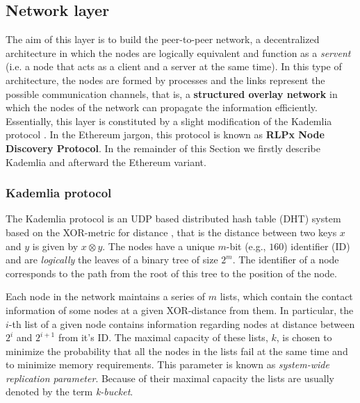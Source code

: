 \subsection{Network layer}
\label{sec:network-layer}

The aim of this layer is to build the peer-to-peer network, a decentralized
architecture in which the nodes are logically equivalent and function as a
\emph{servent} (i.e. a node that acts as a client and a server at the same
time). In this type of architecture, the nodes are formed by processes and the
links represent the possible communication channels, that is, a
\textbf{structured overlay network} \cite{van2017distributed} in which the nodes
of the network can propagate the information efficiently. Essentially, this
layer is constituted by a slight modification of the Kademlia protocol
\cite{bib:kademlia}. In the Ethereum jargon, this protocol is known as
\textbf{RLPx Node Discovery Protocol}.
In the remainder of this Section we firstly describe Kademlia and afterward
the Ethereum variant.


\subsubsection{Kademlia protocol}
The Kademlia protocol is an UDP based distributed hash table (DHT)
system based on the
XOR-metric for distance \cite{bib:kademlia}, that is the distance between two
keys $x$ and $y$ is given by $x \otimes y$.
The nodes have a unique $m$-bit (e.g., $160$) identifier (ID) and are
\emph{logically} the leaves of a binary tree of size $2^m$.
The identifier of a node corresponds
to the path from the root of this tree to the position of the node.

Each node in the network maintains a series of $m$
lists, which contain the contact information of some nodes at a given
XOR-distance from them.
In particular, the $i$-th list of a given node contains
information regarding nodes at distance between $2^i$ and $2^{i+1}$ from
it's ID.
The maximal capacity of these lists, $k$, is chosen to minimize the
probability that all the nodes in the lists fail at the same
time and to minimize memory requirements.
This parameter is  known as \emph{system-wide replication parameter}.
Because of their maximal capacity the lists are usually denoted by the term
\emph{k-bucket}.


